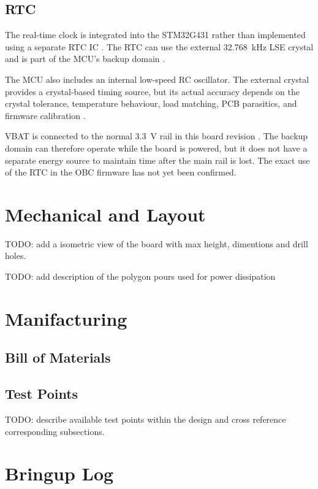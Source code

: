 \documentclass[10pt]{../datasheet}
\begin{document}
\subsection{RTC}

The real-time clock is integrated into the STM32G431 rather than implemented
using a separate RTC IC \cite{stm32g431-datasheet,stm32g4-reference-manual}.
The RTC can use the external 32.768~kHz LSE crystal and is part of the MCU's
backup domain \cite{stm32g4-reference-manual}.

The MCU also includes an internal low-speed RC oscillator. The external crystal
provides a crystal-based timing source, but its actual accuracy depends on the
crystal tolerance, temperature behaviour, load matching, PCB parasitics, and
firmware calibration
\cite{stm32-oscillator-guide,abracon-abs07,stm32g4-reference-manual}.

VBAT is connected to the normal 3.3~V rail in this board revision
\cite{obc-schematic}. The backup domain can therefore operate while the board
is powered, but it does not have a separate energy source to maintain time after
the main rail is lost. The exact use of the RTC in the OBC firmware has not yet
been confirmed.

\section{Mechanical and Layout}

TODO: add a isometric view of the board with max height, dimentions and drill
holes.

TODO: add description of the polygon pours used for power dissipation

\section{Manifacturing}

\subsection{Bill of Materials}

\subsection{Test Points}

TODO: describe available test points within the design and cross reference
corresponding subsections.

\section{Bringup Log}
\end{document}
